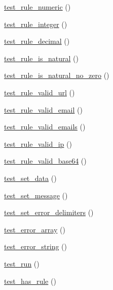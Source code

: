 \begin{DoxyCompactItemize}
\item 
\hyperlink{class_form__validation__test_acffed236a9860f9ec0760adfa6cfab14}{test\+\_\+rule\+\_\+numeric} ()
\item 
\hyperlink{class_form__validation__test_a8112afaddb8124b3cf99b627cef71103}{test\+\_\+rule\+\_\+integer} ()
\item 
\hyperlink{class_form__validation__test_a6e656aa3822493ab265a776baa2c5c41}{test\+\_\+rule\+\_\+decimal} ()
\item 
\hyperlink{class_form__validation__test_abdca321712ae5cd229ccc1addfea4cf4}{test\+\_\+rule\+\_\+is\+\_\+natural} ()
\item 
\hyperlink{class_form__validation__test_a80ecf8848faefbcbab55db54eea37d8e}{test\+\_\+rule\+\_\+is\+\_\+natural\+\_\+no\+\_\+zero} ()
\item 
\hyperlink{class_form__validation__test_a12347e497d236029d63b96c215782c26}{test\+\_\+rule\+\_\+valid\+\_\+url} ()
\item 
\hyperlink{class_form__validation__test_a20ac2f2329783d1a27ab9f3278267c36}{test\+\_\+rule\+\_\+valid\+\_\+email} ()
\item 
\hyperlink{class_form__validation__test_a9ad7251e7803ccc713f81e7f1a8598da}{test\+\_\+rule\+\_\+valid\+\_\+emails} ()
\item 
\hyperlink{class_form__validation__test_a2c15c9e47e20218ca926e3ddb40bf589}{test\+\_\+rule\+\_\+valid\+\_\+ip} ()
\item 
\hyperlink{class_form__validation__test_ab74e970dfe948fee7c783135ae33cd28}{test\+\_\+rule\+\_\+valid\+\_\+base64} ()
\item 
\hyperlink{class_form__validation__test_a743fb3b803188015203b6494698b9144}{test\+\_\+set\+\_\+data} ()
\item 
\hyperlink{class_form__validation__test_a32e5cb1cce37e22da6b29548cd49e0a0}{test\+\_\+set\+\_\+message} ()
\item 
\hyperlink{class_form__validation__test_aff1c6fda4943af6cafc2a45900850f72}{test\+\_\+set\+\_\+error\+\_\+delimiters} ()
\item 
\hyperlink{class_form__validation__test_aed05f2587277f837ade1e10666fd648d}{test\+\_\+error\+\_\+array} ()
\item 
\hyperlink{class_form__validation__test_af6df1cc9e7b6a321ce8cc651ed1ca0f4}{test\+\_\+error\+\_\+string} ()
\item 
\hyperlink{class_form__validation__test_a9b029832cfdf19c0ef36b1f5ef7b7735}{test\+\_\+run} ()
\item 
\hyperlink{class_form__validation__test_a80d573b37bd734f2b8f5e8e6bb19f0e3}{test\+\_\+has\+\_\+rule} ()

\end{DoxyCompactItemize}
